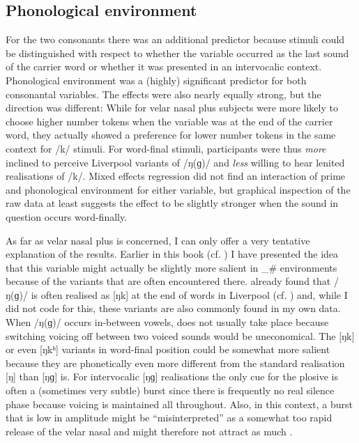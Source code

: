 		\subsection{Phonological environment}

For the two consonants there was an additional predictor because stimuli could be distinguished with respect to whether the variable occurred as the last sound of the carrier word or whether it was presented in an intervocalic context.
Phonological environment was a (highly) significant predictor for both consonantal variables.
The effects were also nearly equally strong, but the direction was different: While for velar nasal plus subjects were more likely to choose higher number tokens when the variable was at the end of the carrier word, they actually showed a preference for lower number tokens in the same context for /k/ stimuli.
For word-final stimuli, participants were thus \emph{more} inclined to perceive Liverpool variants of /ŋ(ɡ)/ and \emph{less} willing to hear lenited realisations of /k/.
Mixed effects regression did not find an interaction of prime and phonological environment for either variable, but graphical inspection of the raw data at least suggests the  effect to be slightly stronger when the sound in question occurs word-finally.

\newpage 
As far as velar nasal plus is concerned, I can only offer a very tentative explanation of the results.
Earlier in this book (cf. ) I have presented the idea that this variable might actually be slightly more salient in \_\# environments because of the variants that are often encountered there.
\textcite{knowles1973} already found that /ŋ(ɡ)/ is often realised as [ŋk] at the end of words in Liverpool (cf. ) and, while I did not code for this, these variants are also commonly found in my own data.
When /ŋ(ɡ)/ occurs in-between vowels,  does not usually take place because switching voicing off between two voiced sounds would be uneconomical.
The [ŋk] or even [ŋkʰ] variants in word-final position could be somewhat more salient because they are phonetically even more different from the standard realisation [ŋ] than [ŋɡ] is.
For intervocalic [ŋɡ] realisations the only cue for the plosive is often a (sometimes very subtle) burst since there is frequently no real silence phase because voicing is maintained all throughout.
Also, in this context, a burst that is low in amplitude might be ``misinterpreted'' as a somewhat too rapid release of the velar nasal and might therefore not attract as much .

